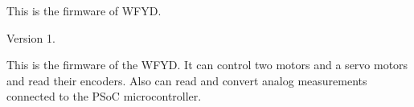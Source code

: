 This is the firmware of W\+F\+YD. \begin{DoxyVersion}{Version}
1.
\end{DoxyVersion}
This is the firmware of the W\+F\+YD. It can control two motors and a servo motors and read their encoders. Also can read and convert analog measurements connected to the P\+SoC microcontroller. 